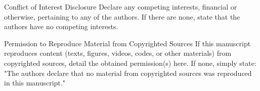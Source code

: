 \documentclass[titlepage]{geomorphica}
\begin{document}
\begin{closing}{Conflict of Interest Disclosure}
	Declare any competing interests, financial or otherwise, pertaining to any of the authors. If there are none, state that the authors have no competing interests.
\end{closing}
\begin{closing}{Permission to Reproduce Material from Copyrighted Sources}
	If this manuscript reproduces content (texts, figures, videos, codes, or other materials) from copyrighted sources, detail the obtained permission(s) here. If none, simply state: "The authors declare that no material from copyrighted sources was reproduced in this manuscript."
\end{closing}
\end{document}
